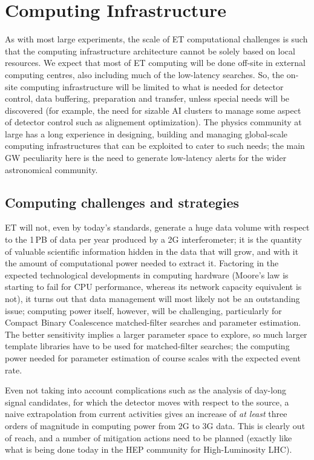 \section{Computing Infrastructure}
\label{chap:GlobalComputingInfrastructure}
As with most large experiments, the scale of ET computational challenges is such that the computing infrastructure architecture cannot be solely based on local resources. 
We expect that most of ET computing will be done off-site in external computing centres, also including much of the low-latency searches. 
So, the on-site computing infrastructure will be limited to what is needed for detector control, data buffering, preparation and transfer, unless special needs will be discovered (for example, the need for sizable AI clusters to manage some aspect of detector control such as alignement optimization). The physics community at large has a long experience in designing, building and managing global-scale computing infrastructures that can be exploited to cater to such needs; the main GW peculiarity here is the need to generate low-latency alerts
for the wider astronomical community.  

\subsection[Computing challenges and strategies]{Computing challenges and strategies}
\label{sec:Computing challenges and strategies}
ET will not, even by today's standards, generate a huge data volume with respect to the 1\,PB of data per year produced by a 2G interferometer; it is the quantity of valuable scientific information hidden in the data that will grow, and with it the amount of computational power needed to extract it.  Factoring in the expected technological developments in computing hardware (Moore's law is starting to fail for CPU performance, whereas its network capacity equivalent is not), it turns out that data management will most likely not be an outstanding issue; computing power itself, however, will be challenging, particularly for Compact Binary Coalescence matched-filter searches and parameter estimation. The better sensitivity implies a larger parameter space to explore, so much larger template libraries have to be used for matched-filter searches;  the computing power needed for parameter estimation of course scales with the expected event rate. 


Even not taking into account complications such as the analysis of day-long
signal candidates, for which the detector moves with respect to the source, a naive extrapolation from current activities gives an increase of \emph{at least} three orders of magnitude in computing power from 2G to 3G data. This is clearly out of reach, and a number of mitigation actions need to be planned (exactly like what is being done today in the HEP community for High-Luminosity LHC).

